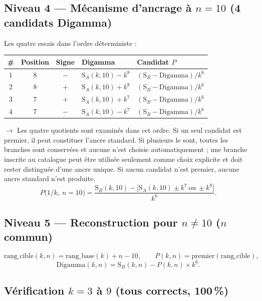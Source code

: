 \documentclass[11pt,a4paper]{article}
\newcommand{\SA}{\mathrm{S}_A}
\newcommand{\SB}{\mathrm{S}_B}
\begin{document}
\subsection{Niveau 4 --- Mécanisme d'ancrage à $n = 10$ (4 candidats Digamma)}

Les quatre essais dans l'ordre déterministe :

\begin{center}
\small
\begin{tabular}{@{}c c c l l@{}}
\toprule
\rowcolor{spectralgris}
\# & Position & Signe & Digamma & Candidat $P$ \\
\midrule
1 & 8 & $-$ & $\SA(k,10) - k^{8}$ & $(\SB - \text{Digamma})/k^{6}$ \\
2 & 8 & $+$ & $\SA(k,10) + k^{8}$ & $(\SB - \text{Digamma})/k^{6}$ \\
3 & 7 & $+$ & $\SA(k,10) + k^{7}$ & $(\SB - \text{Digamma})/k^{6}$ \\
4 & 7 & $-$ & $\SA(k,10) - k^{7}$ & $(\SB - \text{Digamma})/k^{6}$ \\
\bottomrule
\end{tabular}
\end{center}

$\to$ Les quatre quotients sont examinés dans cet ordre. Si un seul candidat
est premier, il peut constituer l'ancre standard. Si plusieurs le sont, toutes
les branches sont conservées et aucune n'est choisie automatiquement ; une
branche inscrite au catalogue peut être utilisée seulement comme choix explicite
et doit rester distinguée d'une ancre unique. Si aucun candidat n'est premier,
aucune ancre standard n'est produite.
\[
P\bigl(1/k,\ n=10\bigr) = \frac{\SB(k,10) - \bigl[\SA(k,10) \pm k^{7}\ \text{ou}\ \pm k^{8}\bigr]}{k^{6}}.
\]

\subsection{Niveau 5 --- Reconstruction pour $n \neq 10$ ($n$ commun)}

\begin{boiteformule}
\[
\text{rang\_cible}(k,n) = \text{rang\_base}(k) + n - 10,
\qquad
P(k,n) = \text{premier}(\text{rang\_cible}),
\]
\[
\text{Digamma}(k,n) = \SB(k,n) - P(k,n) \times k^{6}.
\]
\end{boiteformule}

\subsection{Vérification $k = 3$ à $9$ (tous corrects, 100\,\%)}
\end{document}
